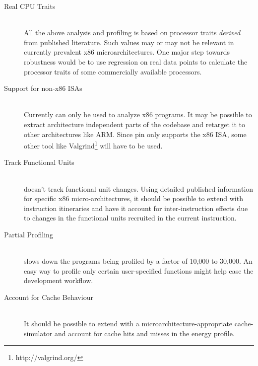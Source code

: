 \begin{description}
\item[Real CPU Traits] \hfill \\ All the above analysis and profiling
  is based on processor traits \textit{derived} from published
  literature.  Such values may or may not be relevant in currently
  prevalent x86 microarchitectures.  One major step towards robustness
  would be to use regression on real data points to calculate the
  processor traits of some commercially available processors.

\item[Support for non-x86 ISAs] \hfill \\ Currently \wattage can only
  be used to analyze x86 programs.  It may be possible to extract
  architecture independent parts of the codebase and retarget it to
  other architectures like ARM.  Since pin only supports the x86 ISA,
  some other tool like Valgrind\footnote{http://valgrind.org/} will
  have to be used.

\item[Track Functional Units] \hfill \\ \wattage doesn't track
  functional unit changes.  Using detailed published information for
  specific x86 micro-architectures, it should be possible to extend
  \wattage with instruction itineraries and have it account for
  inter-instruction effects due to changes in the functional units
  recruited in the current instruction.

\item[Partial Profiling] \hfill \\ \wattage slows down the programs
  being profiled by a factor of 10,000 to 30,000.  An easy way to
  profile only certain user-specified functions might help ease the
  development workflow.

\item[Account for Cache Behaviour] \hfill \\ It should be possible to
  extend \wattage with a microarchitecture-appropriate cache-simulator
  and account for cache hits and misses in the energy profile.
\end{description}
